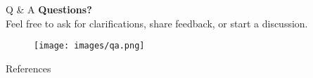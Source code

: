 \documentclass{beamer}
\begin{document}
\begin{frame}{Q \& A}
  \textbf{Questions?} \\
  Feel free to ask for clarifications, share feedback, or start a discussion.
  \vfill
  \begin{figure}
    \texttt{[image: images/qa.png]}
  \end{figure}
\end{frame}


\begin{frame}[allowframebreaks]{References}
  
  
\end{frame}
\end{document}
